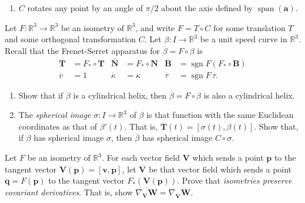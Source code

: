 \documentclass[12 pt, letterpaper]{hmcpset}
\begin{document}
\begin{solution}
\begin{enumerate}
\[\begin{split}
									& = \lVert C(\mathbf{p} - \mathbf{q}) \rVert \\
									& = \lVert \mathbf{p} - \mathbf{q} \rVert \\
									& = d(\mathbf{p}, \mathbf{q}).
				\end{split}
			\] \\
			Since $C$ preserves norms and distances, it is an orthogonal transformation.
		\item $C$ rotates any point by an angle of $\pi/2$ about the axis defined by $\operatorname{span}(\mathbf{a})$.
	\end{enumerate}
\end{solution}

\pagebreak

\begin{problem}[Problem 4.]
	Let $F : \mathbb{R}^{3} \to \mathbb{R}^{3}$ be an isometry of $\mathbb{R}^{3}$, and write $F = T \circ C$ for some translation $T$ and some orthogonal transformation $C$. Let $\beta : I \to \mathbb{R}^{3}$ be a unit speed curve in $\mathbb{R}^{3}$. Recall that the Frenet-Serret apparatus for $\overline{\beta} = F \circ \beta$ is
	\begin{align*}
		\overline{\mathbf{T}} & = F_{*} \circ \mathbf{T} & \overline{\mathbf{N}} & = F_{*} \circ \mathbf{N} & \overline{\mathbf{B}} & = \operatorname{sgn} F (F_{*} \circ \mathbf{B}) \\
		\overline{v} & = 1 & \overline{\kappa} & = \kappa & \overline{\tau} & = \operatorname{sgn} F \, \tau.
	\end{align*}
	\begin{enumerate}
		\item Show that if $\beta$ is a cylindrical helix, then $\overline{\beta} = F \circ \beta$ is also a cylindrical helix.
		\item The \textit{spherical image} $\sigma : I \to \mathbb{R}^{3}$ of $\beta$ is that function with the same Euclidean coordinates as that of $\beta'(t)$. That is, $\mathbf{T}(t) = [\sigma(t), \beta(t)]$. Show that, if $\beta$ has spherical image $\sigma$, then $\overline{\beta}$ has spherical image $C \circ \sigma$.
	\end{enumerate}
\end{problem}

\pagebreak

\begin{problem}[Problem 5.]
	Let $F$ be an isometry of $\mathbb{R}^{3}$. For each vector field $\mathbf{V}$ which sends a point $\mathbf{p}$ to the tangent vector $\mathbf{V}(\mathbf{p}) = [\mathbf{v}, \mathbf{p}]$, let $\overline{\mathbf{V}}$ be that vector field which sends a point $\mathbf{q} = F(\mathbf{p})$ to the tangent vector $F_{*}(\mathbf{V}(\mathbf{p}))$. Prove that \textit{isometries preserve covariant derivatives}. That is, show $\overline{\nabla_{\mathbf{V}} \mathbf{W}} = \nabla_{\overline{\mathbf{V}}} \overline{\mathbf{W}}$.
\end{problem}
\end{document}
